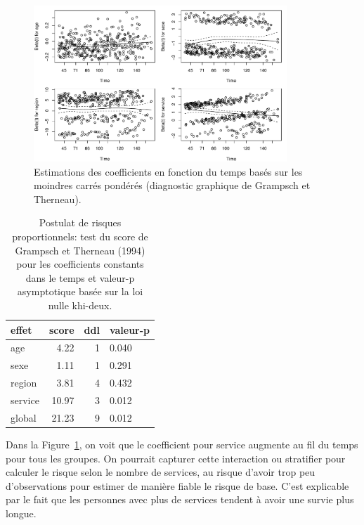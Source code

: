 \documentclass[
  11pt,
  letterpaper,
]{scrbook}
\theoremstyle{definition}
\theoremstyle{remark}
\begin{document}
\begin{figure}[ht!]

{\centering \includegraphics[width=0.85\textwidth,height=\textheight]{./06-survie_files/figure-pdf/fig-coxphhypothese-1.pdf}

}

\caption{\label{fig-coxphhypothese}Estimations des coefficients en
fonction du temps basés sur les moindres carrés pondérés (diagnostic
graphique de Grampsch et Therneau).}

\end{figure}

\hypertarget{tbl-coxphhypothese}{}
\begin{table}
\caption{\label{tbl-coxphhypothese}Postulat de risques proportionnels: test du score de Grampsch et
Therneau (1994) pour les coefficients constants dans le temps et
valeur-p asymptotique basée sur la loi nulle khi-deux. }\tabularnewline

\centering
\begin{tabular}{lrrl}
\toprule
effet & score & ddl & valeur-p\\
\midrule
age & 4.22 & 1 & 0.040\\
sexe & 1.11 & 1 & 0.291\\
region & 3.81 & 4 & 0.432\\
service & 10.97 & 3 & 0.012\\
global & 21.23 & 9 & 0.012\\
\bottomrule
\end{tabular}
\end{table}

Dans la Figure~\ref{fig-coxphhypothese}, on voit que le coefficient pour
service augmente au fil du temps pour tous les groupes. On pourrait
capturer cette interaction ou stratifier pour calculer le risque selon
le nombre de services, au risque d'avoir trop peu d'observations pour
estimer de manière fiable le risque de base. C'est explicable par le
fait que les personnes avec plus de services tendent à avoir une survie
plus longue.
\end{document}
